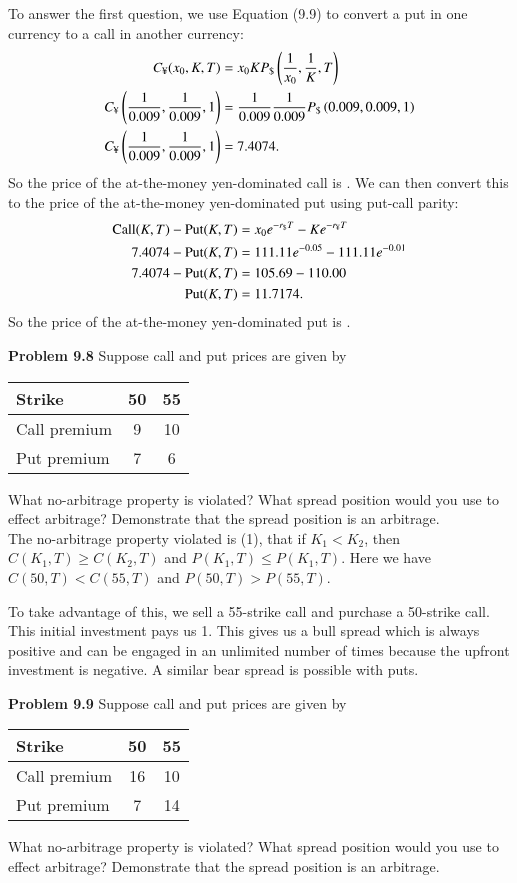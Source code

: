 \documentclass[12pt]{article}
\newcommand{\problem}[1]{\bigskip \noindent \textbf{Problem #1}}
\newcommand{\Call}{\text{Call}}
\newcommand{\Put}{\text{Put}}
\newcommand{\y}{\text{\textyen}}
\theoremstyle{plain}
\begin{document}
\begin{enumerate}[(a)]
To answer the first question, we use Equation (9.9) to convert a put in one currency to a call in another currency:
\begin{align*}
C_{\y}(x_0, K, T) &= x_0 K P_{\$} \left(\frac{1}{x_0}, \frac{1}{K}, T\right)\\
C_{\y}\left(\frac{1}{0.009}, \frac{1}{0.009}, 1\right) &= \frac{1}{0.009} \frac{1}{0.009} P_{\$}\left(0.009, 0.009, 1\right)\\
C_{\y} \left(\frac{1}{0.009}, \frac{1}{0.009}, 1\right) &= 7.4074.
\end{align*}
So the price of the at-the-money yen-dominated call is . We can then convert this to the price of the at-the-money yen-dominated put using put-call parity:
\begin{align*}
\Call(K,T) - \Put(K,T) &= x_0e^{-r_{\$}T} - Ke^{-r_{\y}T}\\
7.4074 - \Put(K,T) &= 111.11e^{-0.05} - 111.11e^{-0.01}\\
7.4074 - \Put(K,T) &= 105.69 - 110.00\\
\Put(K,T) &= 11.7174.
\end{align*}
So the price of the at-the-money yen-dominated put is .
\end{enumerate}

\problem{9.8} Suppose call and put prices are given by
\begin{center}
\begin{tabular}{l||cc}
Strike & 50 & 55\\ \hline \hline
Call premium & 9 & 10\\
Put premium & 7 & 6
\end{tabular}
\end{center}
What no-arbitrage property is violated? What spread position would you use to effect arbitrage? Demonstrate that the spread position is an arbitrage.\\

The no-arbitrage property violated is (1), that if $K_1 < K_2$, then $C(K_1,T) \geq C(K_2,T)$ and $P(K_1,T) \leq P(K_1,T)$. Here we have $C(50,T) < C(55,T)$ and $P(50,T) > P(55,T)$. 

To take advantage of this, we sell a 55-strike call and purchase a 50-strike call. This initial investment pays us 1. This gives us a bull spread which is always positive and can be engaged in an unlimited number of times because the upfront investment is negative. A similar bear spread is possible with puts.

\problem{9.9} Suppose call and put prices are given by
\begin{center}
\begin{tabular}{l||cc}
Strike & 50 & 55\\ \hline \hline
Call premium & 16 & 10\\
Put premium & 7 & 14
\end{tabular}
\end{center}
What no-arbitrage property is violated? What spread position would you use to effect arbitrage? Demonstrate that the spread position is an arbitrage.\\
\end{document}
